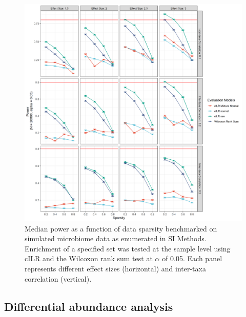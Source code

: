 \documentclass{article}
\begin{document}
\begin{figure}[H]
    \centering
    \includegraphics[scale=0.4]{figures/pwr_single_sample.png}
    \caption{Median power as a function of data sparsity benchmarked on simulated microbiome data as enumerated in SI Methods. Enrichment of a specified set was tested at the sample level using cILR and the Wilcoxon rank sum test at $\alpha$ of 0.05. Each panel represents different effect sizes (horizontal) and inter-taxa correlation (vertical).}
\end{figure}

\subsection*{Differential abundance analysis} 
\end{document}
